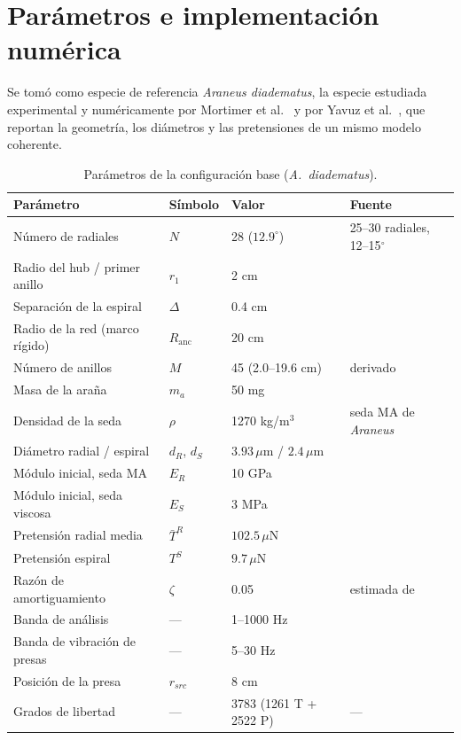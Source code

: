 \documentclass[11pt,letterpaper]{article}
\newcommand{\um}{\,\mu\mathrm{m}}
\newcommand{\uN}{\,\mu\mathrm{N}}
\begin{document}
\section{Parámetros e implementación numérica}

Se tomó como especie de referencia \textit{Araneus diadematus}, la especie
estudiada experimental y numéricamente por Mortimer et al.\
\cite{mortimer2016} y por Yavuz et al.\ \cite{yavuz2024}, que reportan la
geometría, los diámetros y las pretensiones de un mismo modelo coherente.

\begin{table}[H]
\centering\small
\caption{Parámetros de la configuración base (\textit{A.~diadematus}).}
\label{tab:param}
\begin{tabular}{@{}p{4.9cm}lp{3.9cm}p{4.3cm}@{}}
\toprule
Parámetro & Símbolo & Valor & Fuente \\
\midrule
Número de radiales & $N$ & 28 ($12.9^\circ$) & 25--30 radiales, 12--15$^\circ$ \cite{adwAraneus} \\
Radio del hub / primer anillo & $r_1$ & 2 cm & \cite{yavuz2024} \\
Separación de la espiral & $\Delta$ & 0.4 cm & \cite{yavuz2024} \\
Radio de la red (marco rígido) & $R_{\text{anc}}$ & 20 cm & \cite{yavuz2024} \\
Número de anillos & $M$ & 45 (2.0--19.6 cm) & derivado \\
Masa de la araña & $m_a$ & 50 mg & \cite{yavuz2024} \\
Densidad de la seda & $\rho$ & 1270 kg/m$^3$ & seda MA de \textit{Araneus} \cite{stauffer1994} \\
Diámetro radial / espiral & $d_R$, $d_S$ & $3.93\um$ / $2.4\um$ & \cite{yavuz2024} \\
Módulo inicial, seda MA & $E_R$ & 10 GPa & \cite{gosline1999} \\
Módulo inicial, seda viscosa & $E_S$ & 3 MPa & \cite{gosline1999} \\
Pretensión radial media & $\bar{T}^R$ & $102.5\uN$ & \cite{yavuz2024} \\
Pretensión espiral & $T^S$ & $9.7\uN$ & \cite{yavuz2024} \\
Razón de amortiguamiento & $\zeta$ & 0.05 & estimada de \cite{gosline1999} \\
Banda de análisis & --- & 1--1000 Hz & \cite{landolfa1996,yavuz2024} \\
Banda de vibración de presas & --- & 5--30 Hz & \cite{landolfa1996} \\
Posición de la presa & $r_{src}$ & 8 cm & \cite{yavuz2024} \\
\midrule
Grados de libertad & --- & 3783 (1261 T + 2522 P) & --- \\
\bottomrule
\end{tabular}
\end{table}
\end{document}
